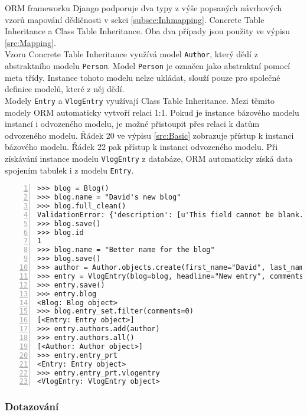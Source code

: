 \documentclass[ing,male,java,dept456]{diploma}						%
\begin{document}
ORM frameworku Django podporuje dva typy z výše popsaných návrhových vzorů mapování dědičnosti v sekci \ref{subsec:Inhmapping}. Concrete Table Inheritance a Class Table Inheritance. Oba dva případy jsou použity ve výpisu \ref{src:Mapping}. \\
Vzoru Concrete Table Inheritance využívá model \lstinline[style=inlinepython]|Author|, který dědí z abstraktního modelu \lstinline[style=inlinepython]|Person|. Model \lstinline[style=inlinepython]|Person| je označen jako abstraktní pomocí meta třídy. Instance tohoto modelu nelze ukládat, slouží pouze pro společné definice modelů, které z něj dědí. \\
Modely \lstinline[style=inlinepython]|Entry| a \lstinline[style=inlinepython]|VlogEntry| využívají Class Table Inheritance. Mezi těmito modely ORM automaticky vytvoří relaci 1:1. Pokud je instance bázového modelu instancí i odvozeného modelu, je možné přistoupit přes relaci k datům odvozeného modelu. Řádek 20 ve výpisu \ref{src:Basic} zobrazuje přístup k instanci bázového modelu. Řádek 22 pak přístup k instanci odvozeného modelu. Při získávání instance modelu \lstinline[style=inlinepython]|VlogEntry| z databáze, ORM automaticky získá data spojením tabulek i z modelu \lstinline[style=inlinepython]|Entry|.

\begin{lstlisting}[style=custompython, numbers=left, label=src:Basic, caption={Ukázka práce s instancí, relacemi a dědičností v Django ORM}]
>>> blog = Blog()
>>> blog.name = "David's new blog"
>>> blog.full_clean()
ValidationError: {'description': [u'This field cannot be blank.']}
>>> blog.save()
>>> blog.id
1
>>> blog.name = "Better name for the blog"
>>> blog.save()
>>> author = Author.objects.create(first_name="David", last_name="Krutký", email="david.krutky.st@vsb.cz")
>>> entry = VlogEntry(blog=blog, headline="New entry", comments=0, rating=0, video="http://example.com")
>>> entry.save()
>>> entry.blog
<Blog: Blog object>
>>> blog.entry_set.filter(comments=0)
[<Entry: Entry object>]
>>> entry.authors.add(author)
>>> entry.authors.all()
[<Author: Author object>]
>>> entry.entry_prt
<Entry: Entry object>
>>> entry.entry_prt.vlogentry
<VlogEntry: VlogEntry object>
\end{lstlisting}

\subsubsection{Dotazování}
\end{document}
